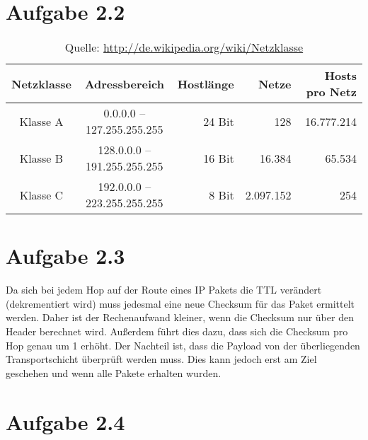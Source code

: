 \documentclass[german,12pt,a4paper]{article}
\begin{document}
\section*{Aufgabe 2.2}
\begin{table}[h]
	\begin{tabular}{|c|c|r|r|r|}\hline
		Netzklasse & Adressbereich               & Hostlänge & Netze      & Hosts pro Netz \\\hline
		Klasse A   &   0.0.0.0 – 127.255.255.255 & 24 Bit    &	      128	& 16.777.214     \\
		Klasse B   & 128.0.0.0 – 191.255.255.255 & 16 Bit    &	   16.384 &	    65.534     \\
		Klasse C   & 192.0.0.0 – 223.255.255.255 & 	8 Bit    &	2.097.152	&        254     \\\hline
	\end{tabular}
	\caption{Quelle: \url{http://de.wikipedia.org/wiki/Netzklasse}}
\end{table}


\section*{Aufgabe 2.3}
Da sich bei jedem Hop auf der Route eines IP Pakets die TTL verändert (dekrementiert wird) muss
jedesmal eine neue Checksum für das Paket ermittelt werden. Daher ist der Rechenaufwand kleiner,
wenn die Checksum nur über den Header berechnet wird. Außerdem führt dies dazu, dass sich die
Checksum pro Hop genau um 1 erhöht. Der Nachteil ist, dass die Payload von der überliegenden
Transportschicht überprüft werden muss. Dies kann jedoch erst am Ziel geschehen und wenn alle Pakete
erhalten wurden.


\section*{Aufgabe 2.4} 
\end{document}
